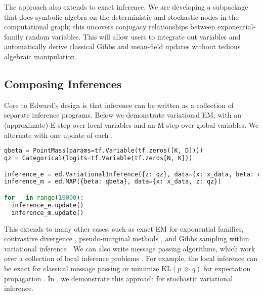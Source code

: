 The approach also extends to exact inference. We are developing a
subpackage that does symbolic algebra on the deterministic and
stochastic nodes in the computational graph; this uncovers conjugacy
relationships between exponential-family random variables. This will
allow users to integrate out variables and automatically derive
classical Gibbs and mean-field updates \citep{bishop2006pattern} without
tedious algebraic manipulation.

\subsection{Composing Inferences}

Core to Edward's design is that inference can be written as a collection
of separate inference programs. Below we demonstrate variational EM,
with an (approximate) E-step over local variables and an M-step over
global variables. We alternate with one update of each \citep{neal1993new}.
\begin{lstlisting}[language=Python]
qbeta = PointMass(params=tf.Variable(tf.zeros([K, D])))
qz = Categorical(logits=tf.Variable(tf.zeros[N, K]))

inference_e = ed.VariationalInference({z: qz}, data={x: x_data, beta: qbeta})
inference_m = ed.MAP({beta: qbeta}, data={x: x_data, z: qz})

for _ in range(10000):
  inference_e.update()
  inference_m.update()
\end{lstlisting}
This extends to many other cases, such as
exact EM for exponential families,
contrastive divergence \citep{hinton2002training},
pseudo-marginal methods \citep{andrieu2009pseudo},
and
Gibbs sampling within variational inference \citep{wang2012truncation}.
We can also write message passing algorithms, which work over a
collection of local inference problems
\citep{koller2009probabilistic}.
%
For example, the local inference can be exact for classical message
passing or minimize $\text{KL}(p\gg q)$ for expectation
propagation \citep{minka2001expectation}.
In , we demonstrate this approach for
stochastic variational inference.
